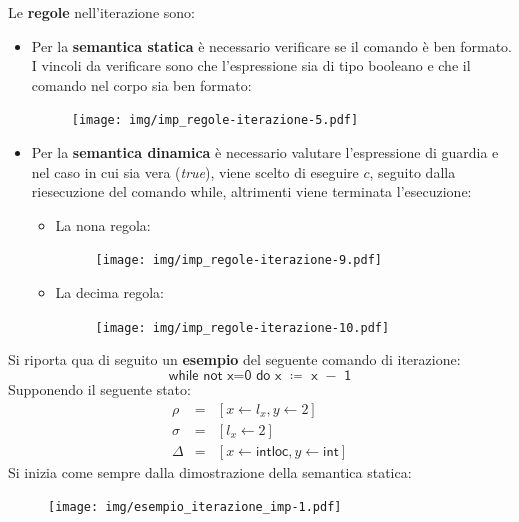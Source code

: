 \documentclass[a4paper]{article}
\begin{document}
 	\noindent
 	Le \textbf{regole} nell'iterazione sono:
 	\begin{itemize}
 		\item Per la \textbf{semantica statica} è necessario verificare se il comando è ben formato. I vincoli da verificare sono che l'espressione sia di tipo booleano e che il comando nel corpo sia ben formato:
 		\begin{figure}[!htp]
 			\centering
 			\texttt{[image: img/imp\_regole-iterazione-5.pdf]}
 		\end{figure}\newpage
 		
 		\item Per la \textbf{semantica dinamica} è necessario valutare l'espressione di guardia e nel caso in cui sia vera (\emph{true}), viene scelto di eseguire $c$, seguito dalla riesecuzione del comando \textsf{while}, altrimenti viene terminata l'esecuzione:
 		\begin{itemize}
 			\item La nona regola:
 			\begin{figure}[!htp]
 				\centering
 				\texttt{[image: img/imp\_regole-iterazione-9.pdf]}
 			\end{figure}
 			
 			\item La decima regola:
 			\begin{figure}[!htp]
 				\centering
 				\texttt{[image: img/imp\_regole-iterazione-10.pdf]}
 			\end{figure}
 		\end{itemize}
 	\end{itemize}
 	Si riporta qua di seguito un \textcolor{Green4}{\textbf{esempio}} del seguente comando di iterazione:
 	\begin{equation*}
 		\textsf{while not x=0 do x $\coloneq$ x $-$ 1}
 	\end{equation*}
 	Supponendo il seguente stato:
 	\begin{equation*}
 		\begin{array}{lll}
 			\rho 	& = & \left[x \leftarrow l_{x}, y \leftarrow 2\right] \\
 			\sigma	& = & \left[l_{x} \leftarrow 2\right] \\
 			\Delta	& = & \left[x \leftarrow \mathsf{intloc}, y \leftarrow \mathsf{int}\right]
 		\end{array}
 	\end{equation*}
 	Si inizia come sempre dalla dimostrazione della semantica statica:
 	\begin{figure}[!htp]
 		\centering
 		\texttt{[image: img/esempio\_iterazione\_imp-1.pdf]}
 	\end{figure}\newpage
 	
\end{document}
